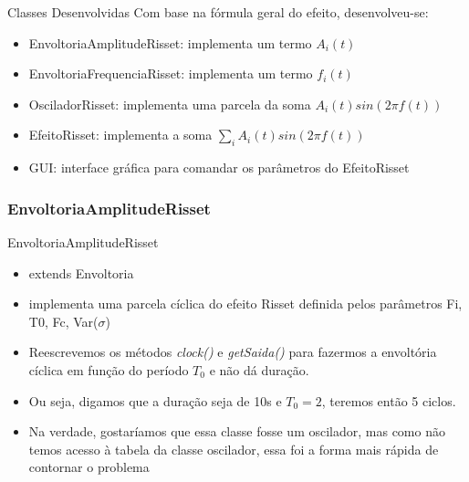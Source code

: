 \documentclass{beamer}
\begin{document}
\begin{frame}{Classes Desenvolvidas}
Com base na fórmula geral do efeito, desenvolveu-se:
\begin{itemize}
\item EnvoltoriaAmplitudeRisset: implementa um termo $A_i(t)$
\item EnvoltoriaFrequenciaRisset: implementa um termo $f_i(t)$
\item OsciladorRisset: implementa uma parcela da soma $A_i(t)sin(2 \pi f(t))$
\item EfeitoRisset: implementa a soma $\sum_i A_i(t)sin(2 \pi f(t))$
\item GUI: interface gráfica para comandar os parâmetros do EfeitoRisset
\end{itemize}

\end{frame}

\subsubsection{EnvoltoriaAmplitudeRisset}
\begin{frame}{EnvoltoriaAmplitudeRisset}
\begin{itemize}
	\item extends Envoltoria
	\item implementa uma parcela cíclica do efeito Risset definida pelos parâmetros
	 Fi, T0, Fc, Var($\sigma$)
	 \item Reescrevemos os métodos \emph{clock()} e \emph{getSaida()} para 
	 fazermos a envoltória cíclica em função do período $T_0$ e não dá duração.
	 \item Ou seja, digamos que a duração seja de 10s e $T_0 = 2$, teremos então
	 5 ciclos.
	 \item Na verdade, gostaríamos que essa classe fosse um oscilador, mas como não
	 temos acesso à tabela da classe oscilador, essa foi a forma mais rápida 
	 de contornar o problema
\end{itemize}

\end{frame}
\end{document}
